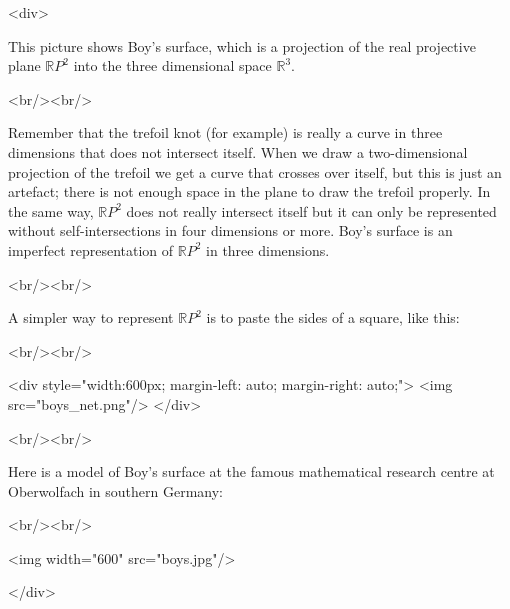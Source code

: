 <div>

This picture shows Boy's surface, which is a projection of the real 
projective plane $\mathbb{R}P^2$ into the three dimensional space 
$\mathbb{R}^3$.

<br/><br/>

Remember that the trefoil knot (for example) is really a curve in three
dimensions that does not intersect itself.  When we draw a two-dimensional
projection of the trefoil we get a curve that crosses over itself, but 
this is just an artefact; there is not enough space in the plane to draw 
the trefoil properly.  In the same way, $\mathbb{R}P^2$ does not really 
intersect itself but it can only be represented without self-intersections 
in four dimensions or more.  Boy's surface is an imperfect representation 
of $\mathbb{R}P^2$ in three dimensions.

<br/><br/>

A simpler way to represent $\mathbb{R}P^2$ is to paste the sides of a square, 
like this:

<br/><br/>

<div style="width:600px; margin-left: auto; margin-right: auto;">
<img src="boys_net.png"/>
</div>

<br/><br/>

Here is a model of Boy's surface at the famous mathematical research centre 
at Oberwolfach in southern Germany:

<br/><br/>

<img width="600" src="boys.jpg"/>


</div>